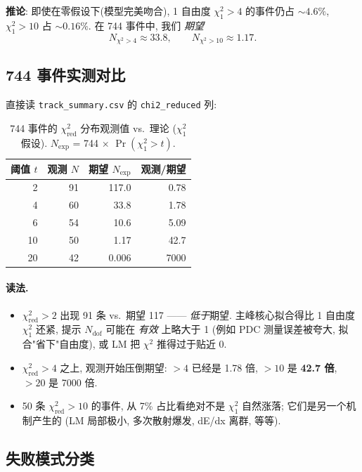 \textbf{推论}: 即使在零假设下(模型完美吻合), 1 自由度 $\chi^2_1 > 4$ 的事件仍占 $\sim 4.6\%$, $\chi^2_1 > 10$ 占 $\sim 0.16\%$. 在 744 事件中, 我们 \emph{期望}
\[
  N_{\chi^2 > 4} \approx 33.8, \qquad N_{\chi^2 > 10} \approx 1.17.
\]

\subsection{744 事件实测对比}
\label{sec:partIII:chi2:measured}

直接读 \texttt{track\_summary.csv} 的 \texttt{chi2\_reduced} 列:

\begin{table}[H]
\centering\small
\caption{744 事件的 $\chi^2_{\mathrm{red}}$ 分布观测值 vs.\ 理论 ($\chi^2_1$ 假设). $N_{\mathrm{exp}}$ = 744 $\times$ $\Pr(\chi^2_1 > t)$.}
\label{tab:partIII:chi2_observed}
\begin{tabular}{rrrr}
\toprule
阈值 $t$ & 观测 $N$ & 期望 $N_{\mathrm{exp}}$ & 观测/期望 \\
\midrule
2  & 91 & 117.0 & 0.78 \\
4  & 60 & 33.8  & 1.78 \\
6  & 54 & 10.6  & 5.09 \\
10 & 50 & 1.17  & 42.7 \\
20 & 42 & 0.006 & 7000 \\
\bottomrule
\end{tabular}
\end{table}

\paragraph{读法.}
\begin{itemize}[nosep]
  \item $\chi^2_{\mathrm{red}} > 2$ 出现 91 条 vs.\ 期望 117 —— \emph{低于}期望. 主峰核心拟合得比 1 自由度 $\chi^2_1$ 还紧, 提示 $N_{\mathrm{dof}}$ 可能在 \emph{有效} 上略大于 1 (例如 PDC 测量误差被夸大, 拟合"省下"自由度), 或 LM 把 $\chi^2$ 推得过于贴近 0.
  \item $\chi^2_{\mathrm{red}} > 4$ 之上, 观测开始压倒期望: $> 4$ 已经是 1.78 倍, $> 10$ 是 \textbf{42.7 倍}, $> 20$ 是 7000 倍.
  \item 50 条 $\chi^2_{\mathrm{red}} > 10$ 的事件, 从 7\% 占比看绝对不是 $\chi^2_1$ 自然涨落; 它们是另一个机制产生的 (LM 局部极小, 多次散射爆发, dE/dx 离群, 等等).
\end{itemize}

\subsection{失败模式分类}
\label{sec:partIII:chi2:taxonomy}

